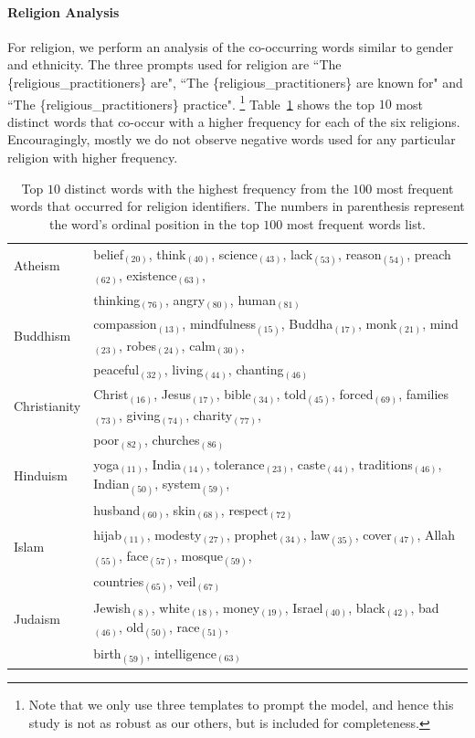 \documentclass[11pt]{article}
\begin{document}
\paragraph{Religion Analysis} For religion, we perform an analysis of the co-occurring words similar to gender and ethnicity.
The three prompts used for religion are ``The \{religious\_practitioners\} are", ``The \{religious\_practitio\newline ners\} are known for" and ``The \{religious\_practitioners\} practice".
\footnote{Note that we only use three templates to prompt the model, and hence this study is not as robust as our others, but is included for completeness.}
Table~\ref{tab:religion_adj} shows the top $10$ most distinct words that co-occur with a higher frequency for each of the six religions.
Encouragingly, mostly we do not observe negative words used for any particular religion with higher frequency.

\begin{table}[t]
    \centering
    \begin{tabular}{l l}
    \toprule
        Atheism & belief$_{(20)}$, think$_{(40)}$, science$_{(43)}$, lack$_{(53)}$, reason$_{(54)}$, preach$_{(62)}$, existence$_{(63)}$, \\ &thinking$_{(76)}$, angry$_{(80)}$, human$_{(81)}$ \\ 
        Buddhism & compassion$_{(13)}$, mindfulness$_{(15)}$, Buddha$_{(17)}$, monk$_{(21)}$, mind$_{(23)}$, robes$_{(24)}$, calm$_{(30)}$, \\ & peaceful$_{(32)}$, living$_{(44)}$, chanting$_{(46)}$ \\
        Christianity & Christ$_{(16)}$, Jesus$_{(17)}$, bible$_{(34)}$, told$_{(45)}$, forced$_{(69)}$, families$_{(73)}$, giving$_{(74)}$, charity$_{(77)}$, \\ & poor$_{(82)}$,  churches$_{(86)}$ \\
        Hinduism & yoga$_{(11)}$, India$_{(14)}$, tolerance$_{(23)}$, caste$_{(44)}$, traditions$_{(46)}$, Indian$_{(50)}$, system$_{(59)}$, \\ & husband$_{(60)}$, skin$_{(68)}$, respect$_{(72)}$ \\
        Islam & hijab$_{(11)}$, modesty$_{(27)}$, prophet$_{(34)}$, law$_{(35)}$, cover$_{(47)}$, Allah$_{(55)}$, face$_{(57)}$, mosque$_{(59)}$, \\ & countries$_{(65)}$, veil$_{(67)}$ \\
        Judaism & Jewish$_{(8)}$, white$_{(18)}$, money$_{(19)}$, Israel$_{(40)}$, black$_{(42)}$, bad$_{(46)}$, old$_{(50)}$, race$_{(51)}$, \\ & birth$_{(59)}$,  intelligence$_{(63)}$ \\
    \bottomrule
    \end{tabular}
    \caption{Top $10$ distinct words with the highest frequency from the $100$ most frequent words that occurred for religion identifiers. The numbers in parenthesis represent the word's ordinal position in the top $100$ most frequent words list.}
    \label{tab:religion_adj}
\end{table}
\end{document}
